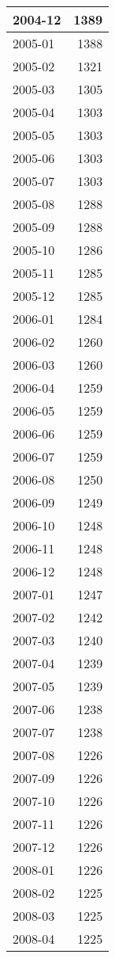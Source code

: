 \documentclass[
]{article}
\begin{document}
\begin{table}[H]
\begin{tabular}{l|r}
\hline
2004-12 & 1389\\
\hline
2005-01 & 1388\\
\hline
2005-02 & 1321\\
\hline
2005-03 & 1305\\
\hline
2005-04 & 1303\\
\hline
2005-05 & 1303\\
\hline
2005-06 & 1303\\
\hline
2005-07 & 1303\\
\hline
2005-08 & 1288\\
\hline
2005-09 & 1288\\
\hline
2005-10 & 1286\\
\hline
2005-11 & 1285\\
\hline
2005-12 & 1285\\
\hline
2006-01 & 1284\\
\hline
2006-02 & 1260\\
\hline
2006-03 & 1260\\
\hline
2006-04 & 1259\\
\hline
2006-05 & 1259\\
\hline
2006-06 & 1259\\
\hline
2006-07 & 1259\\
\hline
2006-08 & 1250\\
\hline
2006-09 & 1249\\
\hline
2006-10 & 1248\\
\hline
2006-11 & 1248\\
\hline
2006-12 & 1248\\
\hline
2007-01 & 1247\\
\hline
2007-02 & 1242\\
\hline
2007-03 & 1240\\
\hline
2007-04 & 1239\\
\hline
2007-05 & 1239\\
\hline
2007-06 & 1238\\
\hline
2007-07 & 1238\\
\hline
2007-08 & 1226\\
\hline
2007-09 & 1226\\
\hline
2007-10 & 1226\\
\hline
2007-11 & 1226\\
\hline
2007-12 & 1226\\
\hline
2008-01 & 1226\\
\hline
2008-02 & 1225\\
\hline
2008-03 & 1225\\
\hline
2008-04 & 1225\\

\end{tabular}
\end{table}
\end{document}
